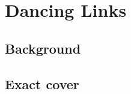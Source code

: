 
\chapter{Dancing Links}
\label{dancing_links}



\section{Background}


\section{Exact cover}



\cite{Colbourn04}